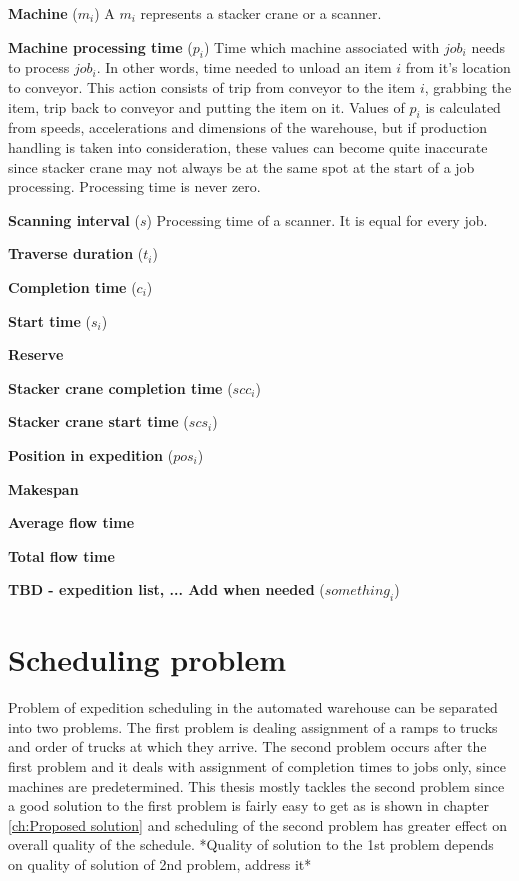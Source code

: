 \documentclass{ctuthesis}
\begin{document}
\noindent \textbf{Machine} ($m_i$) A $m_i$ represents a stacker crane or a scanner. 

\noindent \textbf{Machine processing time} ($p_i$) Time which machine associated with $job_i$ needs to process $job_i$. In other words, time needed to unload an item $i$ from it's location to conveyor. This action consists of trip from conveyor to the item $i$, grabbing the item, trip back to conveyor and putting the item on it. Values of $p_i$ is calculated from speeds, accelerations and dimensions of the warehouse, but if production handling is taken into consideration, these values can become quite inaccurate since stacker crane may not always be at the same spot at the start of a job processing. Processing time is never zero.


\noindent \textbf{Scanning interval} ($s$) Processing time of a scanner. It is equal for every job.

\noindent \textbf{Traverse duration} ($t_i$)

\noindent \textbf{Completion time} ($c_i$)

\noindent \textbf{Start time} ($s_i$)

\noindent \textbf{Reserve}

\noindent \textbf{Stacker crane completion time} ($scc_i$)

\noindent \textbf{Stacker crane start time} ($scs_i$)

\noindent \textbf{Position in expedition} ($pos_i$)

\noindent \textbf{Makespan}

\noindent \textbf{Average flow time}

\noindent \textbf{Total flow time}

\noindent \textbf{TBD - expedition list, ... Add when needed} ($something_i$)


\section{Scheduling problem}
 
 Problem of expedition scheduling in the automated warehouse can be separated into two problems. The first problem is dealing assignment of a ramps to trucks and order of trucks at which they arrive. The second problem occurs after the first problem and it deals with assignment of completion times to jobs only, since machines are predetermined. This thesis mostly tackles the second problem since a good solution to the first problem is fairly easy to get as is shown in chapter \ref{ch:Proposed solution} and scheduling of the second problem has greater effect on overall quality of the schedule. *Quality of solution to the 1st problem depends on quality of solution of 2nd problem, address it* 
 
\end{document}
